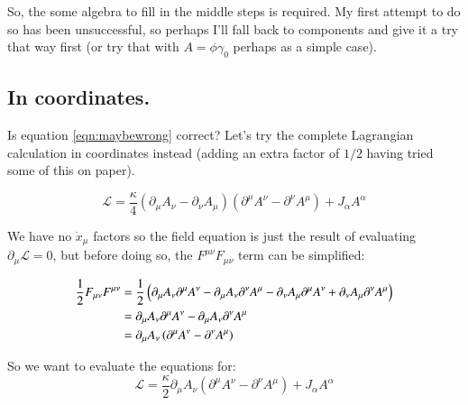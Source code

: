 \documentclass{article}
\newcommand{\LL}[0]{\mathcal{L}}
\begin{document}
So, the some algebra to fill in the middle steps is required.  My
first attempt to do so has been unsuccessful, so perhaps I'll fall back
to components and give it a try that way first (or try that with $A = \phi \gamma_0$ perhaps as a simple case).

\subsection{ In coordinates. }

Is equation \ref{eqn:maybewrong} correct?  Let's try the complete Lagrangian calculation in coordinates instead (adding an extra factor of $1/2$
having tried some of this on paper).

\begin{equation*}
\LL = \frac{\kappa}{4} ( \partial_{\mu} A_{\nu} - \partial_{\nu} A_{\mu} ) ( \partial^{\mu} A^{\nu} - \partial^{\nu} A^{\mu} ) + J_{\alpha} A^{\alpha}
\end{equation*}

We have no $\dot{x}_{\mu}$ factors so the field equation is just the result of evaluating $\partial_{\mu} \LL = 0$, but before doing so, the $F^{\mu\nu}F_{\mu\nu}$ term can be simplified:

\begin{align*}
\frac{1}{2} F_{\mu\nu}F^{\mu\nu}
&=
\frac{1}{2} \left(
 \partial_{\mu} A_{\nu} \partial^{\mu} A^{\nu}
-\partial_{\mu} A_{\nu} \partial^{\nu} A^{\mu}
-\partial_{\nu} A_{\mu} \partial^{\mu} A^{\nu}
+\partial_{\nu} A_{\mu} \partial^{\nu} A^{\mu} \right) \\
&=
\partial_{\mu} A_{\nu} \partial^{\mu} A^{\nu}
-\partial_{\mu} A_{\nu} \partial^{\nu} A^{\mu} \\
&= \partial_{\mu} A_{\nu} \left( \partial^{\mu} A^{\nu} -\partial^{\nu} A^{\mu} \right) \\
\end{align*}


So we want to evaluate the equations for:
\begin{equation*}
\LL = \frac{\kappa}{2} \partial_{\mu} A_{\nu} ( \partial^{\mu} A^{\nu} - \partial^{\nu} A^{\mu} ) + J_{\alpha} A^{\alpha}
\end{equation*}
\end{document}
